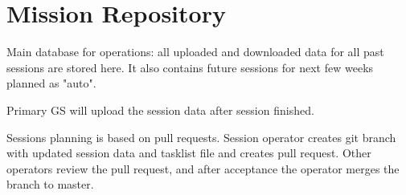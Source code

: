 \section{Mission Repository}

Main database for operations: all uploaded and downloaded data for all past sessions are stored here. It also contains future sessions for next few weeks planned as "auto".

Primary GS will upload the session data after session finished.

Sessions planning is based on pull requests. Session operator creates git branch with updated session data and tasklist file and creates pull request. Other operators review the pull request, and after acceptance the operator merges the branch to master.